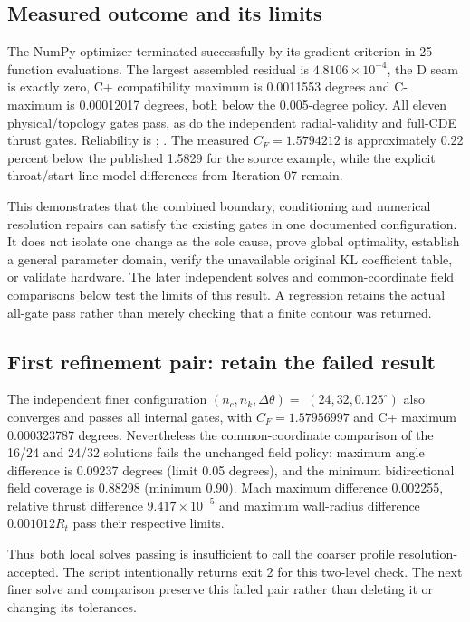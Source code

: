 \subsection{Measured outcome and its limits}
The NumPy optimizer terminated successfully by its gradient criterion in
25 function evaluations. The largest assembled residual is
$4.8106\times10^{-4}$, the D seam is exactly zero, C+ compatibility
maximum is 0.0011553 degrees and C- maximum is 0.00012017 degrees,
both below the 0.005-degree policy. All eleven physical/topology gates
pass, as do the independent radial-validity and full-CDE thrust gates.
Reliability is ;
. The measured $C_F=1.5794212$ is approximately
0.22 percent below the published 1.5829 for the source example, while the
explicit throat/start-line model differences from Iteration 07 remain.

This demonstrates that the combined boundary, conditioning and numerical
resolution repairs can satisfy the existing gates in one documented
configuration. It does not isolate one change as the sole cause, prove
global optimality, establish a general parameter domain, verify the
unavailable original KL coefficient table, or validate hardware. The later
independent solves and common-coordinate field comparisons below test the
limits of this result. A regression retains the actual all-gate pass rather
than merely checking that a finite contour was returned.

\subsection{First refinement pair: retain the failed result}
The independent finer configuration $(n_c,n_k,\Delta\theta)=$
$(24,32,0.125^\circ)$ also converges and passes all internal gates,
with $C_F=1.57956997$ and C+ maximum 0.000323787 degrees. Nevertheless
the common-coordinate comparison of the 16/24 and 24/32 solutions
fails the unchanged field policy: maximum angle difference is
0.09237 degrees (limit 0.05 degrees), and the minimum bidirectional
field coverage is 0.88298 (minimum 0.90). Mach maximum difference
0.002255, relative thrust difference $9.417\times10^{-5}$ and maximum
wall-radius difference $0.001012R_t$ pass their respective limits.

Thus both local solves passing is insufficient to call the coarser
profile resolution-accepted. The script intentionally returns exit 2
for this two-level check. The next finer solve and comparison preserve
this failed pair rather than deleting it or changing its tolerances.

